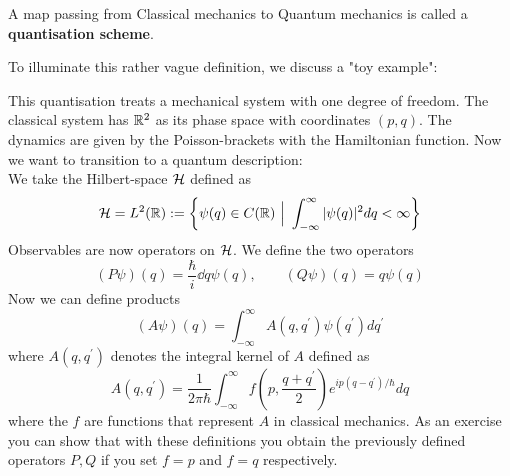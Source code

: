 \begin{definition}
  A map passing from Classical mechanics to Quantum mechanics is called a \textbf{quantisation scheme}.
\end{definition}

To illuminate this rather vague definition, we discuss a "toy example":

\begin{example}
  This quantisation treats a mechanical system with one degree of freedom. The classical system has $\mathbb{R}^2$ as its phase space with coordinates $(p,q)$. The dynamics are given by the Poisson-brackets with the Hamiltonian function. Now we want to transition to a quantum description:\\

  We take the Hilbert-space ${\mathcal{H}}$ defined as
  $$ {\mathcal{H}} = L^2(\mathbb{R}) := \left\{ \psi(q) \in C(\mathbb{R}) \ \Big| \ \int_{-\infty}^\infty |\psi(q)|^2 dq < \infty  \right\} $$
  Observables are now operators on ${\mathcal{H}}$. We define the two operators
  $$ (P\psi)(q) = \frac{\hbar}{i} \dd{}{q} \psi(q), \quad \quad (Q\psi)(q) = q \psi(q) $$
  Now we can define products
  $$ (A\psi)(q) = \int_{-\infty}^\infty A(q,q^\prime) \psi(q^\prime) dq^\prime $$
  where $A(q,q^\prime)$ denotes the integral kernel of $A$ defined as
  $$ A(q,q^\prime) = \frac{1}{2 \pi \hbar} \int_{-\infty}^\infty f\left( p, \frac{q+q^\prime}{2} \right) e^{ip(q-q^\prime)/\hbar} dq $$
  where the $f$ are functions that represent $A$ in classical mechanics. As an exercise you can show that with these definitions you obtain the previously defined operators $P,Q$ if you set $f=p$ and $f=q$ respectively.\\


\end{example}
